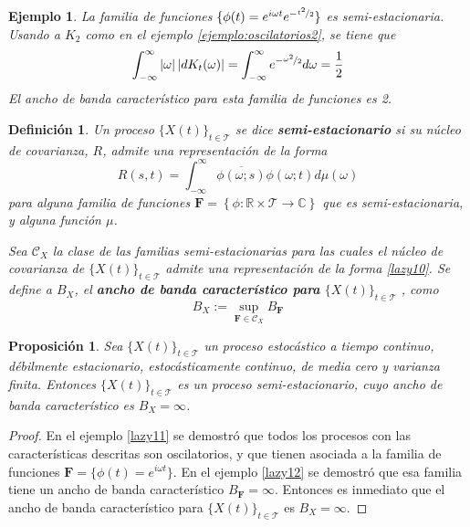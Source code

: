 \documentclass[12pt,letterpaper]{book}
\newtheorem{definicion}{Definición}[chapter]
\newtheorem{proposicion}[teorema]{Proposición}
\newtheorem{ejemplo}{Ejemplo}[chapter]
\newcommand{\R}{\mathbb{R}}
\newcommand{\C}{\mathbb{C}}
\newcommand{\intR}{\int_{-\infty}^{\infty}}
\newcommand{\ef}{\mathbf{F}}
\newcommand{\abso}[1]{\left| #1 \right|}
\newcommand{\xt}{$\{X(t)\}_{t\in \mathcal{T}}$ }
\begin{document}
\begin{ejemplo}
La familia de funciones $\{ \phi(t) = e^{i \omega t} e^{-\nicefrac{t^2}{2}} \}$ es semi-estacionaria. Usando a $K_2$ como en el ejemplo \ref{ejemplo:oscilatorios2}, se tiene que
\begin{equation}
\intR \abso{\omega} \abso{dK_t(\omega)} = \intR e^{-\nicefrac{\omega^2}{2}} d\omega = \frac{1}{2}
\end{equation}
El ancho de banda característico para esta familia de funciones es 2.
\end{ejemplo}

\begin{definicion}
Un proceso \xt se dice \textbf{semi-estacionario} si su núcleo de covarianza, $R$, admite una representación de la forma 
\begin{equation}
R(s,t) = \intR \overline{\phi(\omega;s)}\phi(\omega;t) d\mu(\omega)
\label{lazy10}
\end{equation}
para alguna familia de funciones $\ef = \left\{ \phi: \R \times \mathcal{T} \rightarrow \C \right\}$ que es semi-estacionaria, y alguna función $\mu$.

Sea $\mathcal{C}_X$ la clase de las familias semi-estacionarias para las cuales el núcleo de covarianza de \xt admite una representación de la forma \ref{lazy10}. Se define a $B_X$, el \textbf{ancho de banda característico para} \xt, como
\begin{equation}
B_X := \sup_{\ef \in \mathcal{C}_X} B_\ef
\end{equation}
\label{def:semi_estacionario}
\end{definicion}

\begin{proposicion}
Sea \xt un proceso estocástico a tiempo continuo, débilmente estacionario, estocásticamente continuo, de media cero y varianza finita.
%
Entonces \xt es un proceso semi-estacionario, cuyo ancho de banda característico es $B_X = \infty$.
\end{proposicion}

\begin{proof}
En el ejemplo \ref{lazy11} se demostró que todos los procesos con las características descritas son oscilatorios, y que tienen asociada a la familia de funciones $\ef = \{ \phi(t) = e^{i \omega t} \}$.
%
En el ejemplo \ref{lazy12} se demostró que esa familia tiene un ancho de banda característico $B_\ef = \infty$.
%
Entonces es inmediato que el ancho de banda característico para \xt es $B_X=\infty$.
\end{proof}
\end{document}
